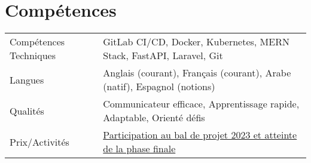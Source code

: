 \documentclass[a4paper,11pt]{article}
\begin{document}
\section{Compétences}
\begin{tabularx}{\linewidth}{@{}l X@{}}
Compétences Techniques & \normalsize{GitLab CI/CD, Docker, Kubernetes, MERN Stack, FastAPI, Laravel, Git}\\
Langues & \normalsize{Anglais (courant), Français (courant), Arabe (natif), Espagnol (notions)}\\
Qualités & \normalsize{Communicateur efficace, Apprentissage rapide, Adaptable, Orienté défis}\\
Prix/Activités & \normalsize{\href{https://drive.google.com/file/d/16UhAiNxRB6kH4zVj_1JtAkfX1AmlOMHL/view}{Participation au bal de projet 2023 et atteinte de la phase finale}}\\
\end{tabularx}
\end{document}
